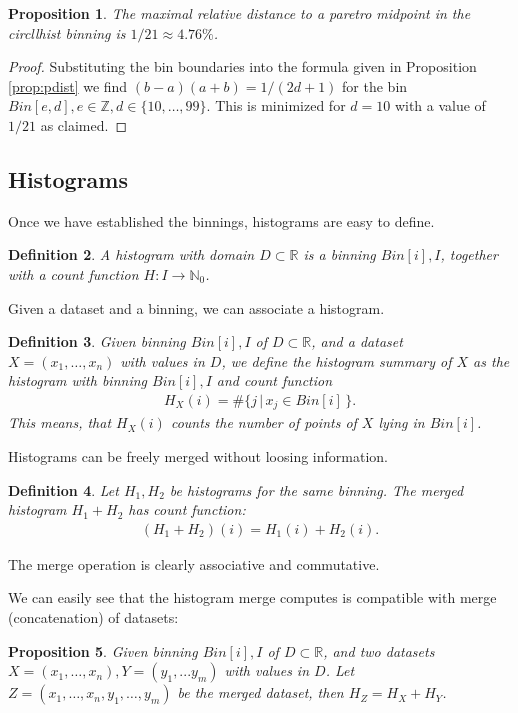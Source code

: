 \documentclass{article}
\theoremstyle{plain}
\newtheorem{definition}{Definition}[section]
\newtheorem{proposition}[definition]{Proposition}
\theoremstyle{remark}
\newcommand{\IN}{\mathbb{N}}
\newcommand{\IR}{\mathbb{R}}
\newcommand{\IZ}{\mathbb{Z}}
\newcommand{\ra}{\rightarrow}
\begin{document}
\begin{proposition}\label{prop:21}
  The maximal relative distance to a paretro midpoint in the circllhist binning is $1/21 \approx 4.76\%$.
\end{proposition}

\begin{proof}
  Substituting the bin boundaries into the formula given in Proposition \ref{prop:pdist} we find
  $(b - a)(a + b) = 1/(2d + 1)$ for the bin $Bin[e,d], e \in \IZ, d \in \{ 10, \dots, 99 \}$.
  This is minimized for $d = 10$ with a value of $1/21$ as claimed.
\end{proof}

\subsection{Histograms}

Once we have established the binnings, histograms are easy to define.

\begin{definition}\label{def:hist}
  A histogram with domain $D \subset \IR$ is a binning $Bin[i],I$, together with a count function $H: I \ra \IN_{0}$.
\end{definition}

Given a dataset and a binning, we can associate a histogram.

\begin{definition}
  Given binning $Bin[i],I$ of $D \subset \IR$, and a dataset $X = (x_1,\dots,x_n)$ with values in
  $D$, we define the histogram summary of $X$ as the histogram with binning $Bin[i],I$ and count
  function
  \begin{align*}
    H_X(i) = \# \{ j \, | \, x_j \in Bin[i] \, \}.
  \end{align*}
  This means, that $H_X(i)$ counts the number of points of $X$ lying in $Bin[i]$.
\end{definition}

Histograms can be freely merged without loosing information.

\begin{definition}
  Let $H_1, H_2$ be histograms for the same binning. The merged histogram $H_1 + H_2$ has count function:
  \begin{align*}
    (H_1+H_2)(i) = H_1(i) + H_2(i).
  \end{align*}
\end{definition}
The merge operation is clearly associative and commutative.

We can easily see that the histogram merge computes is compatible with merge (concatenation) of datasets:
\begin{proposition}
  Given binning $Bin[i],I$ of $D \subset \IR$, and two datasets $X = (x_1,\dots,x_n),Y=(y_1,...y_m)$ with
  values in $D$. Let $Z=(x_1, \dots, x_n, y_1, \dots, y_m)$ be the merged dataset, then $H_Z = H_X + H_Y$.
\end{proposition}
\end{document}

